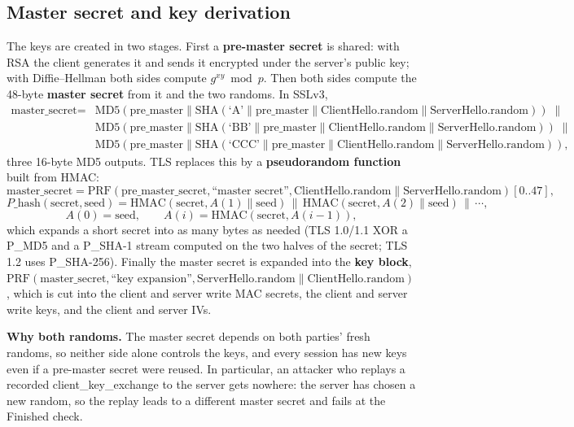 \subsection{Master secret and key derivation \new}

The keys are created in two stages. First a \textbf{pre-master secret} is shared: with RSA the client generates it and sends it encrypted under the server's public key; with Diffie--Hellman both sides compute $g^{xy} \bmod p$. Then both sides compute the 48-byte \textbf{master secret} from it and the two randoms. In SSLv3,
\[
\begin{aligned}
\text{master\_secret} = {}& \mathrm{MD5}(\text{pre\_master} \| \mathrm{SHA}(\text{`A'} \| \text{pre\_master} \| \text{ClientHello.random} \| \text{ServerHello.random})) \;\|\\
& \mathrm{MD5}(\text{pre\_master} \| \mathrm{SHA}(\text{`BB'} \| \text{pre\_master} \| \text{ClientHello.random} \| \text{ServerHello.random})) \;\|\\
& \mathrm{MD5}(\text{pre\_master} \| \mathrm{SHA}(\text{`CCC'} \| \text{pre\_master} \| \text{ClientHello.random} \| \text{ServerHello.random})),
\end{aligned}
\]
three 16-byte MD5 outputs. TLS replaces this by a \textbf{pseudorandom function} built from HMAC:
\[
\text{master\_secret} = \mathrm{PRF}(\text{pre\_master\_secret}, \text{``master secret''}, \text{ClientHello.random} \| \text{ServerHello.random})[0..47],
\]
\[
P\_\mathrm{hash}(\text{secret}, \text{seed}) = \mathrm{HMAC}(\text{secret}, A(1) \| \text{seed}) \,\|\, \mathrm{HMAC}(\text{secret}, A(2) \| \text{seed}) \,\|\, \cdots,
\]
\[
A(0) = \text{seed}, \qquad A(i) = \mathrm{HMAC}(\text{secret}, A(i-1)),
\]
which expands a short secret into as many bytes as needed (TLS 1.0/1.1 XOR a P\_MD5 and a P\_SHA-1 stream computed on the two halves of the secret; TLS 1.2 uses P\_SHA-256). Finally the master secret is expanded into the \textbf{key block}, $\mathrm{PRF}(\text{master\_secret}, \text{``key expansion''}, \text{ServerHello.random} \| \text{ClientHello.random})$, which is cut into the client and server write MAC secrets, the client and server write keys, and the client and server IVs.

\textbf{Why both randoms.} The master secret depends on both parties' fresh randoms, so neither side alone controls the keys, and every session has new keys even if a pre-master secret were reused. In particular, an attacker who replays a recorded client\_key\_exchange to the server gets nowhere: the server has chosen a new random, so the replay leads to a different master secret and fails at the Finished check.

